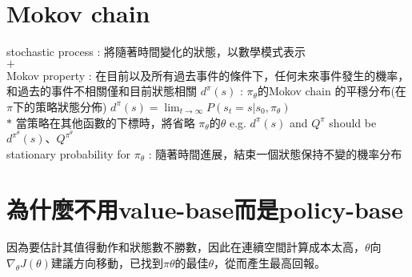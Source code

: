 \documentclass[12pt,a4paper]{article}
\begin{document}
\section{Mokov chain}
stochastic process : 將隨著時間變化的狀態，以數學模式表示\\[5pt]
$+$\\[5pt]
Mokov property : 在目前以及所有過去事件的條件下，任何未來事件發生的機率，和過去的事件不相關僅和目前狀態相關
$d^\pi(s)$ : $\pi_\theta$的Mokov chain 的平穩分布(在$\pi$下的策略狀態分佈) $d^\pi(s) = \lim_{t \to \infty} P(s_t = s \vert s_0, \pi_\theta)$\\[5pt]
$\ast$ 當策略在其他函數的下標時，將省略 $\pi_\theta$的$\theta$  e.g. $d^\pi(s)$ and $Q^\pi$ should be 
$d^\pi^\theta(s)$、$Q^\pi^\theta$\\[5pt]
stationary probability for $\pi_\theta$ : 隨著時間進展，結束一個狀態保持不變的機率分布\\
\section{為什麼不用value-base而是policy-base}
因為要估計其值得動作和狀態數不勝數，因此在連續空間計算成本太高，$\theta$向$\nabla_\theta J(\theta)$建議方向移動，已找到$\pi\theta$的最佳$\theta$，從而產生最高回報。
\end{document}
